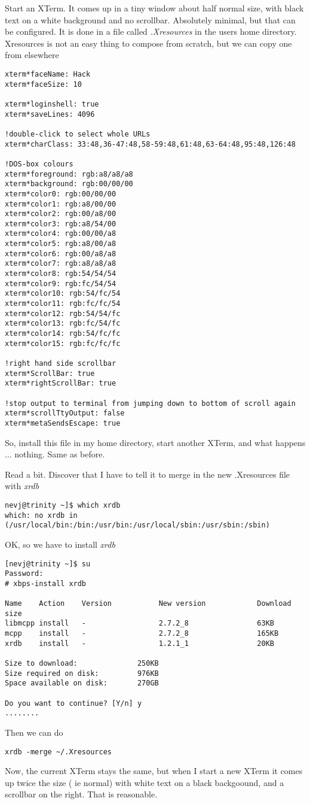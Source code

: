 \documentclass{article}  %
\begin{document}
Start an XTerm. It comes up in a tiny window about half normal size, with black text on a white background and no scrollbar. Absolutely minimal, but that can be configured. It is done in a file called {\em .Xresources} in the users home directory. Xresources is not an easy thing to compose from scratch, but we can copy one from elsewhere
\begin{verbatim}
xterm*faceName: Hack
xterm*faceSize: 10

xterm*loginshell: true
xterm*saveLines: 4096

!double-click to select whole URLs
xterm*charClass: 33:48,36-47:48,58-59:48,61:48,63-64:48,95:48,126:48

!DOS-box colours
xterm*foreground: rgb:a8/a8/a8
xterm*background: rgb:00/00/00
xterm*color0: rgb:00/00/00
xterm*color1: rgb:a8/00/00
xterm*color2: rgb:00/a8/00
xterm*color3: rgb:a8/54/00
xterm*color4: rgb:00/00/a8
xterm*color5: rgb:a8/00/a8
xterm*color6: rgb:00/a8/a8
xterm*color7: rgb:a8/a8/a8
xterm*color8: rgb:54/54/54
xterm*color9: rgb:fc/54/54
xterm*color10: rgb:54/fc/54
xterm*color11: rgb:fc/fc/54
xterm*color12: rgb:54/54/fc
xterm*color13: rgb:fc/54/fc
xterm*color14: rgb:54/fc/fc
xterm*color15: rgb:fc/fc/fc

!right hand side scrollbar
xterm*ScrollBar: true
xterm*rightScrollBar: true

!stop output to terminal from jumping down to bottom of scroll again
xterm*scrollTtyOutput: false
xterm*metaSendsEscape: true
\end{verbatim}
So, install this file in my home directory, start another XTerm, and what happens ... nothing. Same as before. 

Read a bit. Discover that I have to tell it to merge in the new .Xresources file with {\em xrdb} 
\begin{verbatim}
nevj@trinity ~]$ which xrdb
which: no xrdb in (/usr/local/bin:/bin:/usr/bin:/usr/local/sbin:/usr/sbin:/sbin)
\end{verbatim}
OK, so we have to install {\em xrdb}
\begin{verbatim}
[nevj@trinity ~]$ su
Password: 
# xbps-install xrdb

Name    Action    Version           New version            Download size
libmcpp install   -                 2.7.2_8                63KB 
mcpp    install   -                 2.7.2_8                165KB 
xrdb    install   -                 1.2.1_1                20KB 

Size to download:              250KB
Size required on disk:         976KB
Space available on disk:       270GB

Do you want to continue? [Y/n] y
........
\end{verbatim}
Then we can do 
\begin{verbatim}
xrdb -merge ~/.Xresources
\end{verbatim}
Now, the current XTerm stays the same, but when I start a new XTerm it comes up twice the size ( ie normal) with white text on a black backgoound, and a scrollbar on the right.  That is reasonable.
\end{document}
